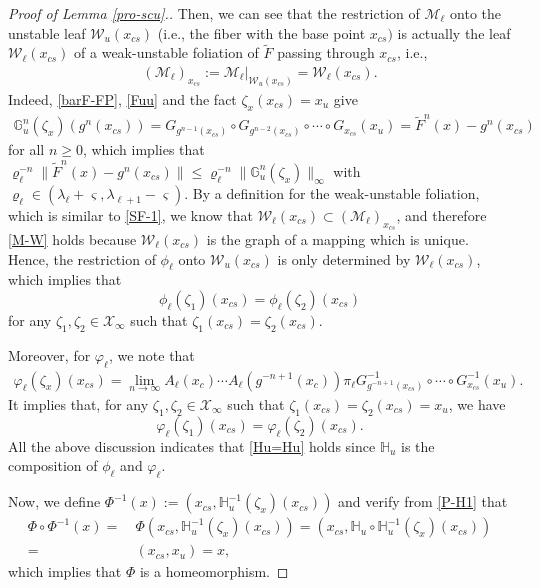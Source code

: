 \documentclass[reqno]{amsart}
\numberwithin{equation}{section}
\begin{document}
\begin{proof}[Proof of Lemma {\rm \ref{pro-scu}}.]
Then, we can see that the restriction of $\mathcal{M}_{\ell}$ onto the unstable leaf ${\mathcal W}_u(x_{cs})$ (i.e., the fiber with the base point $x_{cs})$ is actually the leaf ${\mathcal W}_\ell(x_{cs})$ of a weak-unstable foliation of $\tilde{F}$ passing through $x_{cs}$, i.e.,
\begin{align}\label{M-W}
(\mathcal{M}_{\ell})_{x_{cs}}:=\mathcal{M}_{\ell}|_{{\mathcal W}_u(x_{cs})}={\mathcal W}_\ell(x_{cs}).
\end{align}
Indeed, \eqref{barF-FP}, \eqref{Fuu} and the fact $\zeta_x(x_{cs}) = x_u$ give
\begin{align*}
\mathbb{G}_{u}^{n}(\zeta_x)(g^n(x_{cs}))
=
G_{g^{n-1}(x_{cs})}\circ G_{g^{n-2}(x_{cs})}\circ \cdots \circ G_{x_{cs}}(x_u)
=\tilde{F}^n(x)-g^n(x_{cs})
\end{align*}
for all $n\ge 0$, which implies that
$
\varrho_{\ell}^{-n}\|\tilde{F}^n(x)-g^n(x_{cs})\|\le \varrho_{\ell}^{-n}\|\mathbb{G}_{u}^{n}(\zeta_x)\|_{\infty}
$
with $\varrho_{\ell}\in (\lambda_{\ell}+\varsigma,\lambda_{\ell+1}-\varsigma)$. By a definition for the weak-unstable foliation, which is similar to
\eqref{SF-1}, we know that
${\mathcal W}_\ell(x_{cs})\subset (\mathcal{M}_{\ell})_{x_{cs}}$, and therefore \eqref{M-W} holds because ${\mathcal W}_\ell(x_{cs})$ is the graph of a mapping which is unique. Hence, the restriction of $\phi_\ell$ onto ${\mathcal W}_u(x_{cs})$ is only determined by ${\mathcal W}_\ell(x_{cs})$, which implies that
$$
\phi_\ell(\zeta_1)(x_{cs})=\phi_\ell(\zeta_2)(x_{cs})
$$
for any $\zeta_1,\zeta_2\in \mathcal{X}_\infty$ such that $\zeta_1(x_{cs})=\zeta_2(x_{cs})$.

Moreover, for $\varphi_\ell$, we note that
\begin{align*}
  \varphi_\ell(\zeta_x)(x_{cs})= \lim_{n\to \infty}
A_{\ell}(x_c) \cdots A_{\ell}(g^{-n+1}(x_c)) \pi_{\ell}G_{g^{-n+1}(x_{cs})}^{-1} \circ \cdots \circ G_{x_{cs}}^{-1}(x_u).
\end{align*}
It implies that, for any $\zeta_1,\zeta_2\in \mathcal{X}_\infty$ such that $\zeta_1(x_{cs})=\zeta_2(x_{cs})=x_u$, we have
$$
\varphi_\ell(\zeta_1)(x_{cs})=\varphi_\ell(\zeta_2)(x_{cs}).
$$
All the above discussion indicates  that \eqref{Hu=Hu} holds since
$\mathbb{H}_u$ is the composition of $\phi_\ell$ and $\varphi_\ell$.


Now, we define $\Phi^{-1}(x):=(x_{cs},\mathbb{H}_u^{-1}(\zeta_x)(x_{cs}))$ and verify from \eqref{P-H1} that
\begin{align*}
\Phi \circ \Phi^{-1}(x)=&~\Phi(x_{cs},\mathbb{H}_u^{-1}(\zeta_x)(x_{cs}))
=(x_{cs},\mathbb{H}_u \circ \mathbb{H}_u^{-1}(\zeta_x)(x_{cs}))
\\
=&~ (x_{cs},x_u)=x,
\end{align*}
which implies that $\Phi$ is a homeomorphism.




\end{proof}
\end{document}
